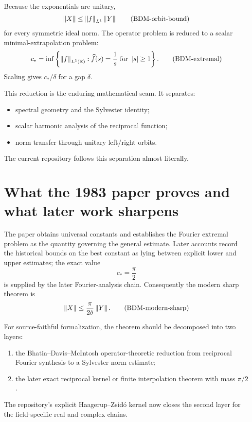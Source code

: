 Because the exponentials are unitary,
\begin{equation}
  \left\lVert X\right\rVert
  \le \left\lVert f\right\rVert_{L^1}\left\lVert Y\right\rVert
  \tag{BDM-orbit-bound}
\end{equation}
for every symmetric ideal norm. The operator problem is reduced to a scalar minimal-extrapolation problem:
\begin{equation}
  c_*
  =\inf\left\{
    \left\lVert f\right\rVert_{L^1(\mathbb{R})}:
    \widehat f(s)=\frac1s\text{ for }\left\lvert s\right\rvert\ge1
  \right\}.
  \tag{BDM-extremal}
\end{equation}
Scaling gives $c_*/\delta$ for a gap $\delta$.

This reduction is the enduring mathematical seam. It separates:
\begin{itemize}[leftmargin=2em]
\item spectral geometry and the Sylvester identity;
\item scalar harmonic analysis of the reciprocal function;
\item norm transfer through unitary left/right orbits.
\end{itemize}
The current repository follows this separation almost literally.

\section{What the 1983 paper proves and what later work sharpens}

The paper obtains universal constants and establishes the Fourier extremal problem as the quantity governing the general estimate. Later accounts record the historical bounds on the best constant as lying between explicit lower and upper estimates; the exact value
\[
  c_*=\frac\pi2
\]
is supplied by the later Fourier-analysis chain. Consequently the modern sharp theorem is
\begin{equation}
  \left\lVert X\right\rVert
  \le\frac{\pi}{2\delta}\left\lVert Y\right\rVert.
  \tag{BDM-modern-sharp}
\end{equation}

For source-faithful formalization, the theorem should be decomposed into two layers:
\begin{enumerate}[leftmargin=2em]
\item the Bhatia--Davis--McIntosh operator-theoretic reduction from reciprocal Fourier synthesis to a Sylvester norm estimate;
\item the later exact reciprocal kernel or finite interpolation theorem with mass $\pi/2$.
\end{enumerate}
The repository's explicit Haagerup--Zsidó kernel now closes the second layer for the field-specific real and complex chains.

